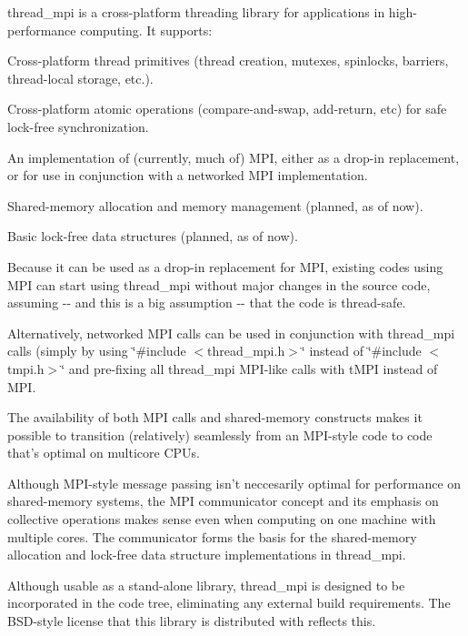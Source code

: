 thread\-\_\-mpi is a cross-\/platform threading library for applications in high-\/performance computing. \-It supports\-:


\begin{DoxyItemize}
\item \-Cross-\/platform thread primitives (thread creation, mutexes, spinlocks, barriers, thread-\/local storage, etc.).
\item \-Cross-\/platform atomic operations (compare-\/and-\/swap, add-\/return, etc) for safe lock-\/free synchronization.
\item \-An implementation of (currently, much of) \-M\-P\-I, either as a drop-\/in replacement, or for use in conjunction with a networked \-M\-P\-I implementation.
\item \-Shared-\/memory allocation and memory management (planned, as of now).
\item \-Basic lock-\/free data structures (planned, as of now).
\end{DoxyItemize}

\-Because it can be used as a drop-\/in replacement for \-M\-P\-I, existing codes using \-M\-P\-I can start using thread\-\_\-mpi without major changes in the source code, assuming -\/-\/ and this is a big assumption -\/-\/ that the code is thread-\/safe.

\-Alternatively, networked \-M\-P\-I calls can be used in conjunction with thread\-\_\-mpi calls (simply by using \char`\"{}\#include $<$thread\-\_\-mpi.\-h$>$\char`\"{} instead of \char`\"{}\#include $<$tmpi.\-h$>$\char`\"{} and pre-\/fixing all thread\-\_\-mpi \-M\-P\-I-\/like calls with t\-M\-P\-I instead of \-M\-P\-I.

\-The availability of both \-M\-P\-I calls and shared-\/memory constructs makes it possible to transition (relatively) seamlessly from an \-M\-P\-I-\/style code to code that's optimal on multicore \-C\-P\-Us.

\-Although \-M\-P\-I-\/style message passing isn't neccesarily optimal for performance on shared-\/memory systems, the \-M\-P\-I communicator concept and its emphasis on collective operations makes sense even when computing on one machine with multiple cores. \-The communicator forms the basis for the shared-\/memory allocation and lock-\/free data structure implementations in thread\-\_\-mpi.

\-Although usable as a stand-\/alone library, thread\-\_\-mpi is designed to be incorporated in the code tree, eliminating any external build requirements. \-The \-B\-S\-D-\/style license that this library is distributed with reflects this.

